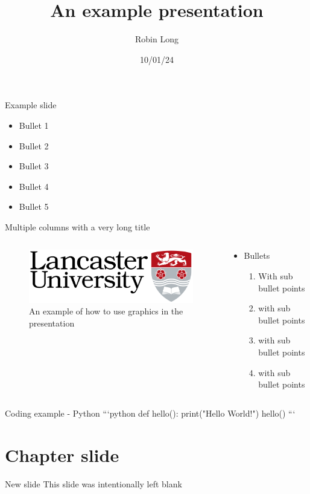 \documentclass[aspectratio=169]{beamer}
\title{An example presentation}
\author{Robin Long}
\date{10/01/24}
\begin{document}
\maketitle

\begin{frame}{Example slide}
\begin{itemize}
\item Bullet 1
\item Bullet 2
\item Bullet 3
\item Bullet 4
\item Bullet 5
\end{itemize}
\end{frame}

\begin{frame}{Multiple columns with a very long title}
\begin{columns}[T]
\begin{column}{0.48\textwidth}
\begin{figure}
\centering
\includegraphics[width=\textwidth]{img/lu-logo.png}
\caption{An example of how to use graphics in the presentation}
\end{figure}
\end{column}

\begin{column}{0.48\textwidth}
\begin{itemize}
\item Bullets
  \begin{enumerate}
  \item With sub bullet points
  \item with sub bullet points
  \item with sub bullet points
  \item with sub bullet points
  \end{enumerate}
\end{itemize}
\end{column}
\end{columns}
\end{frame}

\begin{frame}{Coding example - Python}
```python
def hello():
print("Hello World!")
hello()
```
\end{frame}

\section{Chapter slide}\label{chapter-slide}

\begin{frame}{New slide}
This slide was intentionally left blank
\end{frame}
\end{document}

